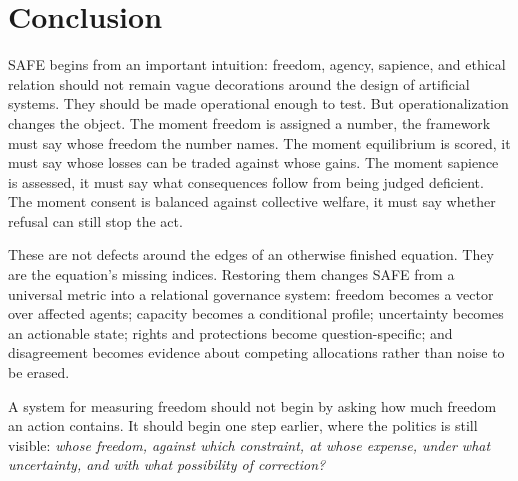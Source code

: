 \documentclass[11pt]{article}
\begin{document}
\section{Conclusion}
SAFE begins from an important intuition: freedom, agency, sapience, and ethical relation should not remain vague decorations around the design of artificial systems. They should be made operational enough to test. But operationalization changes the object. The moment freedom is assigned a number, the framework must say whose freedom the number names. The moment equilibrium is scored, it must say whose losses can be traded against whose gains. The moment sapience is assessed, it must say what consequences follow from being judged deficient. The moment consent is balanced against collective welfare, it must say whether refusal can still stop the act.

These are not defects around the edges of an otherwise finished equation. They are the equation's missing indices. Restoring them changes SAFE from a universal metric into a relational governance system: freedom becomes a vector over affected agents; capacity becomes a conditional profile; uncertainty becomes an actionable state; rights and protections become question-specific; and disagreement becomes evidence about competing allocations rather than noise to be erased.

A system for measuring freedom should not begin by asking how much freedom an action contains. It should begin one step earlier, where the politics is still visible: \emph{whose freedom, against which constraint, at whose expense, under what uncertainty, and with what possibility of correction?}

\printbibliography
\end{document}
